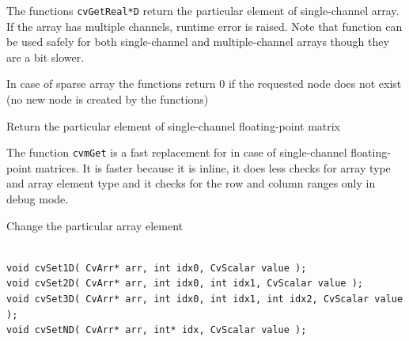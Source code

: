 \begin{description}
\end{description}


The functions \texttt{cvGetReal*D} return the particular element of single-channel array. If the array has multiple channels, runtime error is raised. Note that  function can be used safely for both single-channel and multiple-channel arrays though they are a bit slower.

In case of sparse array the functions return 0 if the requested node does not exist (no new node is created by the functions)

\label{mGet}

Return the particular element of single-channel floating-point matrix


\begin{description}
\end{description}

The function \texttt{cvmGet} is a fast replacement for 
in case of single-channel floating-point matrices. It is faster because
it is inline, it does less checks for array type and array element type
and it checks for the row and column ranges only in debug mode.

\label{SetnD}

Change the particular array element

\begin{lstlisting}

void cvSet1D( CvArr* arr, int idx0, CvScalar value );
void cvSet2D( CvArr* arr, int idx0, int idx1, CvScalar value );
void cvSet3D( CvArr* arr, int idx0, int idx1, int idx2, CvScalar value );
void cvSetND( CvArr* arr, int* idx, CvScalar value );

\end{lstlisting}

\begin{description}
\end{description}


